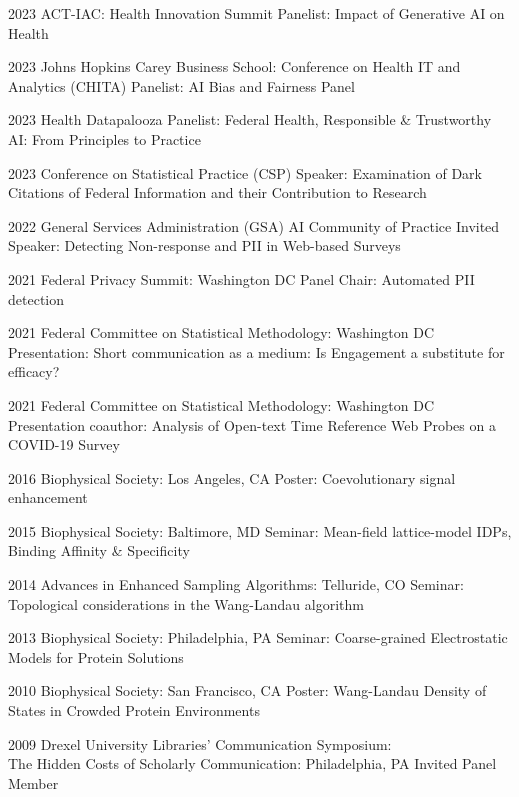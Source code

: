 \documentclass[]{scrartcl}
\begin{document}
\begin{cleanCV}
\WorkExperienceX
{2023}
{ACT-IAC: Health Innovation Summit}
{Panelist: Impact of Generative AI on Health}

\WorkExperienceX
{2023}
{Johns Hopkins Carey Business School: Conference on Health IT and Analytics (CHITA)}
{Panelist: AI Bias and Fairness Panel}

\WorkExperienceX
{2023}
{Health Datapalooza}
{Panelist: Federal Health, Responsible \& Trustworthy AI: From Principles to Practice}

\WorkExperienceX
{2023}
{Conference on Statistical Practice (CSP)}
{Speaker: Examination of Dark Citations of Federal Information and their Contribution to Research}

\WorkExperienceX
{2022}
{General Services Administration (GSA) AI Community of Practice}
{Invited Speaker: Detecting Non-response and PII in Web-based Surveys}

\WorkExperienceX
{2021}
{Federal Privacy Summit: Washington DC}
{Panel Chair: Automated PII detection}

\WorkExperienceX
{2021}
{Federal Committee on Statistical Methodology: Washington DC}
{Presentation: Short communication as a medium: Is Engagement a substitute for efficacy?}

\WorkExperienceX
{2021}
{Federal Committee on Statistical Methodology: Washington DC}
{Presentation coauthor: Analysis of Open-text Time Reference Web Probes on a COVID-19 Survey}

\WorkExperienceX
{2016}
{Biophysical Society: Los Angeles, CA}
{Poster: Coevolutionary signal enhancement}


\WorkExperienceX
{2015}
{Biophysical Society: Baltimore, MD}
{Seminar: Mean-field lattice-model IDPs, Binding Affinity \& Specificity}

\WorkExperienceX
{2014}
{Advances in Enhanced Sampling Algorithms: Telluride, CO}
{Seminar: Topological considerations in the Wang-Landau algorithm}

\WorkExperienceX
{2013}
{Biophysical Society: Philadelphia, PA}
{Seminar: Coarse-grained Electrostatic Models for Protein Solutions}

\WorkExperienceX
{2010}
{Biophysical Society: San Francisco, CA}
{Poster: Wang-Landau Density of States in Crowded Protein Environments}

\WorkExperienceX
{2009}
{Drexel University Libraries' Communication Symposium:\\The Hidden Costs of Scholarly Communication: Philadelphia, PA}
{Invited Panel Member}


\end{cleanCV}
\end{document}
